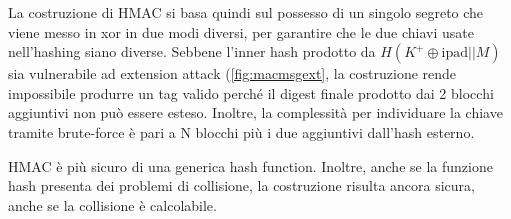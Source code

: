 La costruzione di HMAC si basa quindi sul possesso di un singolo segreto che viene messo in xor in due modi diversi, per garantire che le due chiavi usate nell'hashing siano diverse. Sebbene l'inner hash prodotto da $H(K^+\oplus{\text{ipad}}||M)$ sia vulnerabile ad extension attack (\cref{fig:macmsgext}, la costruzione rende impossibile produrre un tag valido perché il digest finale prodotto dai 2 blocchi aggiuntivi non può essere esteso. Inoltre, la complessità per individuare la chiave tramite brute-force è pari a N blocchi più i due aggiuntivi dall'hash esterno. 
\begin{remark}
    HMAC è più sicuro di una generica hash function. Inoltre, anche se la funzione hash presenta dei problemi di collisione, la costruzione risulta ancora sicura, anche se la collisione è calcolabile.
\end{remark}
